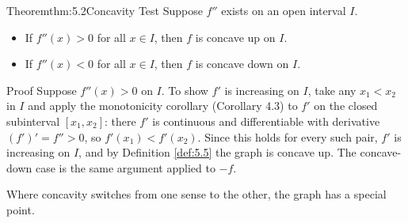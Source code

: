 \documentclass[a4paper,12pt,oneside]{memoir}
\begin{document}
\begin{envtheorem}{Theorem}{thm:5.2}{Concavity Test}
Suppose \(f''\) exists on an open interval \(I\).

\begin{itemize}
  \item If \(f''(x) > 0\) for all \(x \in I\), then \(f\) is concave up on \(I\).
  \item If \(f''(x) < 0\) for all \(x \in I\), then \(f\) is concave down on \(I\).
\end{itemize}
\end{envtheorem}
\begin{envproof}{Proof}{}{}
Suppose \(f''(x) > 0\) on \(I\). To show \(f'\) is increasing on \(I\), take any \(x_{1} < x_{2}\) in \(I\) and apply the monotonicity corollary (Corollary 4.3) to \(f'\) on the closed subinterval \([x_{1}, x_{2}]\): there \(f'\) is continuous and differentiable with derivative \((f')' = f'' > 0\), so \(f'(x_{1}) < f'(x_{2})\). Since this holds for every such pair, \(f'\) is increasing on \(I\), and by Definition \ref{def:5.5} the graph is concave up. The concave-down case is the same argument applied to \(-f\). \qedmark
\end{envproof}
Where concavity switches from one sense to the other, the graph has a special point.
\end{document}
